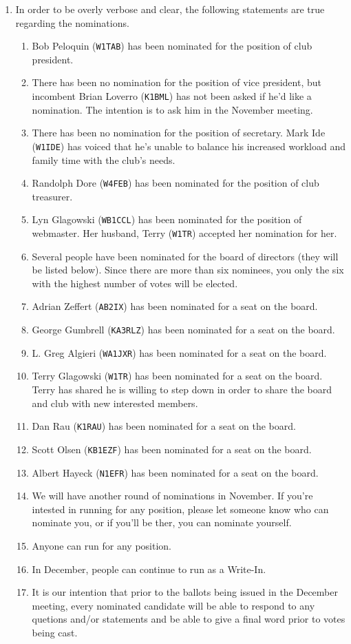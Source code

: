 \documentclass[10pt,letterpaper]{article}
\begin{document}
\begin{enumerate}
  \item In order to be overly verbose and clear, the following statements are true regarding the nominations.
  \begin{enumerate}
    \item Bob Peloquin (\texttt{W1TAB}) has been nominated for the position of club president.
    \item There has been no nomination for the position of vice president, but incombent Brian Loverro (\texttt{K1BML}) has not been asked if he'd like a nomination. The intention is to ask him in the November meeting.
    \item There has been no nomination for the position of secretary. Mark Ide (\texttt{W1IDE}) has voiced that he's unable to balance his increased workload and family time with the club's needs.
    \item Randolph Dore (\texttt{W4FEB}) has been nominated for the position of club treasurer.
    \item Lyn Glagowski (\texttt{WB1CCL}) has been nominated for the position of webmaster. Her husband, Terry (\texttt{W1TR}) accepted her nomination for her.
    \item Several people have been nominated for the board of directors (they will be listed below). Since there are more than six nominees, you only the six with the highest number of votes will be elected.
    \item Adrian Zeffert (\texttt{AB2IX}) has been nominated for a seat on the board.
    \item George Gumbrell (\texttt{KA3RLZ}) has been nominated for a seat on the board.
    \item L. Greg Algieri (\texttt{WA1JXR}) has been nominated for a seat on the board.
    \item Terry Glagowski (\texttt{W1TR}) has been nominated for a seat on the board. Terry has shared he is willing to step down in order to share the board and club with new interested members.
    \item Dan Rau (\texttt{K1RAU}) has been nominated for a seat on the board.
    \item Scott Olsen (\texttt{KB1EZF}) has been nominated for a seat on the board.
    \item Albert Hayeck (\texttt{N1EFR}) has been nominated for a seat on the board.
    \item We will have another round of nominations in November. If you're intested in running for any position, please let someone know who can nominate you, or if you'll be ther, you can nominate yourself.
    \item Anyone can run for any position.
    \item In December, people can continue to run as a Write-In.
    \item It is our intention that prior to the ballots being issued in the December meeting, every nominated candidate will be able to respond to any quetions and/or statements and be able to give a final word prior to votes being cast.

  \end{enumerate}
\end{enumerate}
\end{document}
